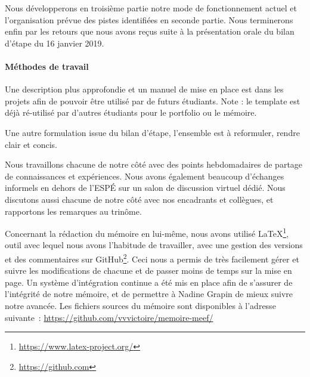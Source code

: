 Nous développerons en troisième partie notre mode de fonctionnement actuel et l’organisation prévue des pistes identifiées en seconde partie.
Nous terminerons enfin par les retours que nous avons reçus suite à la présentation orale du bilan d’étape du 16 janvier 2019.

\paragraph{Méthodes de travail}


Une description plus approfondie et un manuel de mise en place est dans les projets
afin de pouvoir être utilisé par de futurs étudiants. Note : le template est déjà ré-utilisé par d'autres étudiants pour le portfolio ou le mémoire.

{\color{red}Une autre formulation issue du bilan d'étape, l'ensemble est à reformuler, rendre clair et concis.}

Nous travaillons chacune de notre côté avec des points hebdomadaires de partage
de connaissances et expériences. Nous avons également beaucoup d’échanges informels
en dehors de l’ESPÉ sur un salon de discussion virtuel dédié. Nous discutons aussi
chacune de notre côté avec nos encadrants et collègues, et rapportons les remarques au trinôme.

Concernant la rédaction du mémoire en lui-même, nous avons utilisé \LaTeX\footnote{\url{https://www.latex-project.org/}},
outil avec lequel nous avons l’habitude de travailler, avec une gestion des versions
et des commentaires sur GitHub\footnote{\url{https://github.com}}.
Ceci nous a permis de très facilement gérer et suivre les modifications de chacune
et de passer moins de temps sur la mise en page. Un système d'intégration continue
a été mis en place afin de s'assurer de l'intégrité de notre mémoire, et de
permettre à Nadine Grapin de mieux suivre notre avancée. Les fichiers sources
du mémoire sont disponibles
à l'adresse suivante : \url{https://github.com/vvvictoire/memoire-meef/}
